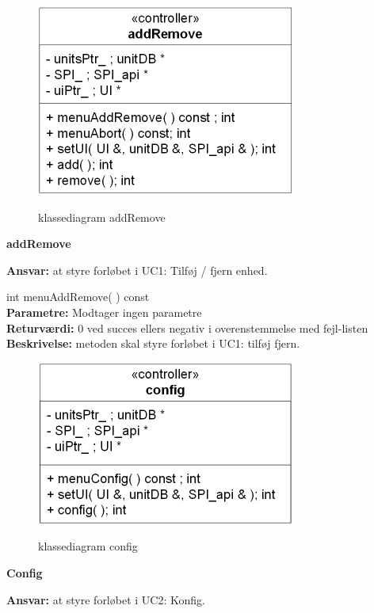\newpage

\begin{figure}[htbp] \centering
{\includegraphics[scale=1.5]{filer/design/Klassediagrammer/sw_addRemove}}
\caption{klassediagram addRemove}
\label{fig:addRemove klassediagram}
\end{figure} 

{\centering
\textbf{addRemove}\par
}
\textbf{Ansvar:} at styre forløbet i UC1: Tilføj / fjern enhed. \

int menuAddRemove( ) const \\
\textbf{Parametre:} Modtager ingen parametre \\
\textbf{Returværdi:} 0 ved succes ellers negativ i overenstemmelse med fejl-listen \\
\textbf{Beskrivelse:} metoden skal styre forløbet i UC1: tilføj fjern.\\

\begin{figure}[htbp] \centering
{\includegraphics[scale=1.5]{filer/design/Klassediagrammer/sw_config}}
\caption{klassediagram config}
\label{fig:config klassediagram}
\end{figure} 

{\centering
\textbf{Config}\par
}
\textbf{Ansvar:} at styre forløbet i UC2: Konfig. \

